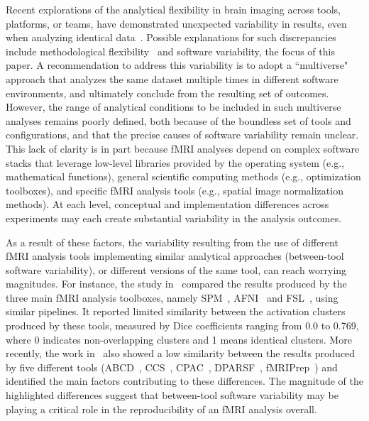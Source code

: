 \documentclass[11pt,onecolumn]{article}
\begin{document}
Recent explorations of the analytical flexibility in brain imaging across
tools, platforms, or teams, have demonstrated unexpected variability in
results, even when analyzing identical data~\cite{botvinik2020variability}. Possible explanations for
such discrepancies include methodological flexibility~\cite{carp2012plurality} and software
variability, the focus of this paper. A recommendation to address this
variability is to adopt a ``multiverse" approach that analyzes the same
dataset multiple times in different software environments, and ultimately
conclude from the resulting set of outcomes. However, the range of
analytical conditions to be included in such multiverse analyses remains
poorly defined, both because of the boundless set of tools and
configurations, and that the precise causes of software variability remain
unclear. This lack of clarity is in part because fMRI analyses depend on
complex software stacks that leverage low-level libraries provided by the
operating system (e.g., mathematical functions), general scientific
computing methods (e.g., optimization toolboxes), and specific fMRI
analysis tools (e.g., spatial image normalization methods). At each level,
conceptual and implementation differences across experiments may each
create substantial variability in the analysis outcomes.

As a result of these factors, the variability resulting from the use of
different fMRI analysis tools implementing similar analytical approaches
(between-tool software variability), or different versions of the same tool,
 can reach worrying magnitudes. For instance, the
study in~\cite{bowring2019exploring} compared the results produced by the
three main fMRI analysis toolboxes, namely SPM~\cite{penny2011statistical},
AFNI~\cite{cox1996afni} and FSL~\cite{jenkinson2012fsl}, using similar
pipelines. It reported limited similarity between the activation clusters
produced by these tools, measured by Dice coefficients ranging from 0.0 to
0.769, where 0 indicates non-overlapping
clusters and 1 means identical clusters. More recently, the work
in~\cite{Li2021.12.01.470790} also showed a low similarity between the
results produced by five different tools (ABCD~\cite{feczko2021adolescent},
CCS~\cite{xu2015connectome}, CPAC~\cite{craddock2013towards}, DPARSF~\cite{yan2010dparsf},
fMRIPrep~\cite{esteban2019fmriprep}) and identified the main
factors contributing to these differences. The magnitude of the highlighted
differences suggest that between-tool software variability may be playing a critical
role in the reproducibility of an fMRI analysis overall. 
\end{document}
